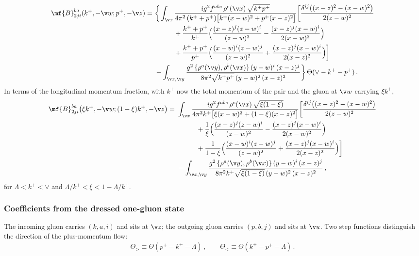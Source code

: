 \begin{align}\label{B2coeffX}
\mf{B}^{ba}_{2ji}(k^{+},-\v w;p^{+},-\v z)=\ &\bigg\{\int_{\v x}
\frac{ig^{2}f^{abc}\,\rho^{c}(\v x)\,\sqrt{k^{+}p^{+}}}{4\pi^{2}\,(k^{+}+p^{+})\big[k^{+}(x-w)^{2}+p^{+}(x-z)^{2}\big]}
\bigg[\frac{\delta^{ij}\big((x-z)^{2}-(x-w)^{2}\big)}{2(z-w)^{2}}\notag\\
&\hspace{1cm}+\frac{k^{+}+p^{+}}{k^{+}}\Big(\frac{(x-z)^{j}(z-w)^{i}}{(z-w)^{2}}-\frac{(x-z)^{j}(x-w)^{i}}{2(x-w)^{2}}\Big)\notag\\
&\hspace{1cm}+\frac{k^{+}+p^{+}}{p^{+}}\Big(\frac{(x-w)^{i}(z-w)^{j}}{(z-w)^{2}}+\frac{(x-z)^{j}(x-w)^{i}}{2(x-z)^{2}}\Big)\bigg]\notag\\
&-\int_{\v x,\v y}\frac{g^{2}\,\{\rho^{a}(\v y),\rho^{b}(\v x)\}\,(y-w)^{i}\,(x-z)^{j}}{8\pi^{2}\sqrt{k^{+}p^{+}}\,(y-w)^{2}\,(x-z)^{2}}\bigg\}\,
\Theta(\vee-k^{+}-p^{+})\,.
\end{align}
In terms of the longitudinal momentum fraction, with $k^{+}$ now the total momentum of the pair and the
gluon at $\v w$ carrying $\xi k^{+}$,
\begin{align}\label{B2coeffXxi}
\mf{B}^{ba}_{2ji}\big(\xi k^{+},-\v w;(1-\xi)k^{+},-\v z\big)=\ &\int_{\v x}
\frac{ig^{2}f^{abc}\,\rho^{c}(\v x)\,\sqrt{\xi(1-\xi)}}{4\pi^{2}k^{+}\big[\xi(x-w)^{2}+(1-\xi)(x-z)^{2}\big]}
\bigg[\frac{\delta^{ij}\big((x-z)^{2}-(x-w)^{2}\big)}{2(z-w)^{2}}\notag\\
&\hspace{1cm}+\frac{1}{\xi}\Big(\frac{(x-z)^{j}(z-w)^{i}}{(z-w)^{2}}-\frac{(x-z)^{j}(x-w)^{i}}{2(x-w)^{2}}\Big)\notag\\
&\hspace{1cm}+\frac{1}{1-\xi}\Big(\frac{(x-w)^{i}(z-w)^{j}}{(z-w)^{2}}+\frac{(x-z)^{j}(x-w)^{i}}{2(x-z)^{2}}\Big)\bigg]\notag\\
&-\int_{\v x,\v y}\frac{g^{2}\,\{\rho^{a}(\v y),\rho^{b}(\v x)\}\,(y-w)^{i}\,(x-z)^{j}}
{8\pi^{2}k^{+}\sqrt{\xi(1-\xi)}\,(y-w)^{2}\,(x-z)^{2}}\,,
\end{align}
for $\Lambda<k^{+}<\vee$ and $\Lambda/k^{+}<\xi<1-\Lambda/k^{+}$.

\subsubsection{Coefficients from the dressed one-gluon state}\label{subsec:coeffglue}
The incoming gluon carries $(k,a,i)$ and sits at $\v z$; the outgoing gluon carries $(p,b,j)$ and sits at
$\v u$. Two step functions distinguish the direction of the plus-momentum flow:
\begin{align}
\Theta_{>}\equiv\Theta(p^{+}-k^{+}-\Lambda)\,,\qquad \Theta_{<}\equiv\Theta(k^{+}-p^{+}-\Lambda)\,.
\end{align}

